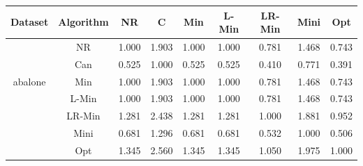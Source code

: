 \documentclass[11pt]{book}
\begin{document}
\begin{table}

	\centering
	
\begin{tabular}{|c|c|c|c|c|c|c|c|c|}

    \hline
    Dataset &
    	Algorithm &
    	NR &
    	C &
    	Min &
    	L-Min &
    	LR-Min &
    	Mini &
    	Opt \\
    	    
    \hline
    \multirow{5}{*}{abalone}
         & NR & 1.000 & 1.903 & 1.000 & 1.000 & 0.781 & 1.468 & 0.743 \\                                                                                                                                             
         & Can & 0.525 & 1.000 & 0.525 & 0.525 & 0.410 & 0.771 & 0.391 \\                                                                                                                                            
         & Min & 1.000 & 1.903 & 1.000 & 1.000 & 0.781 & 1.468 & 0.743 \\                                                                                                                                            
         & L-Min & 1.000 & 1.903 & 1.000 & 1.000 & 0.781 & 1.468 & 0.743 \\                                                                                                                                          
         & LR-Min & 1.281 & 2.438 & 1.281 & 1.281 & 1.000 & 1.881 & 0.952 \\                                                                                                                                         
         & Mini & 0.681 & 1.296 & 0.681 & 0.681 & 0.532 & 1.000 & 0.506 \\                                                                                                                                           
         & Opt & 1.345 & 2.560 & 1.345 & 1.345 & 1.050 & 1.975 & 1.000 \\
    	

\end{tabular}
\end{table}
\end{document}
